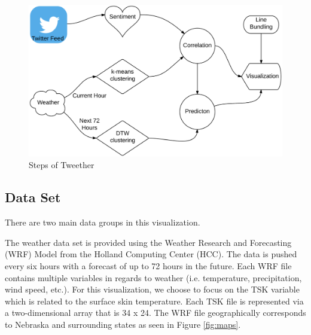 \documentclass[journal]{vgtc}                %
\begin{document}
\begin{figure}[htb]
 \centering
 \includegraphics[scale=0.1]{steps}
 \caption{Steps of Tweether}
 \label{fig:steps}
\end{figure}





\subsection{Data Set}

There are two main data groups in this visualization. 

The weather data set is provided using the Weather Research and Forecasting (WRF) Model from the Holland Computing Center (HCC). The data is pushed every six hours with a forecast of up to 72 hours in the future. Each WRF file contains multiple variables in regards to weather (i.e. temperature, precipitation, wind speed, etc.). For this visualization, we choose to focus on the TSK variable which is related to the surface skin temperature. Each TSK file is represented via a two-dimensional array that is 34 x 24. The WRF file geographically corresponds to Nebraska and surrounding states as seen in Figure \ref{fig:maps}.
\end{document}
